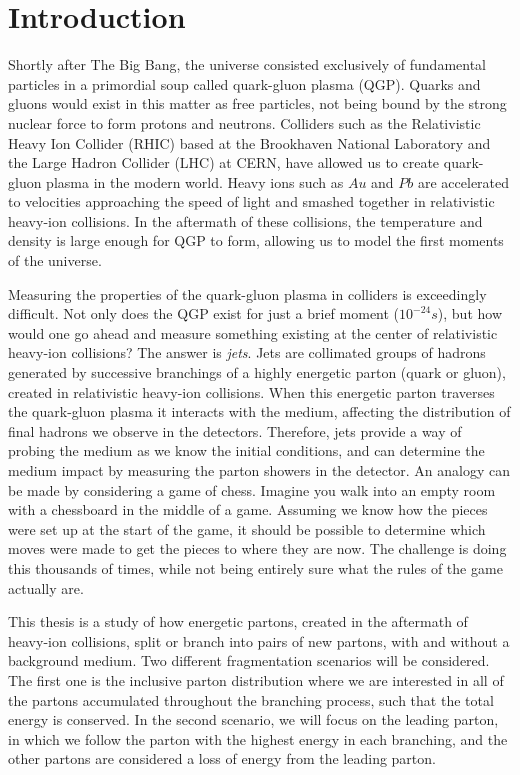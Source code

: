 \documentclass[main.tex]{subfiles}
\begin{document}
\chapter*{Introduction}\label{cpt:intro}
Shortly after The Big Bang, the universe consisted exclusively of fundamental particles in a primordial soup called quark-gluon plasma (QGP). Quarks and gluons would exist in this matter as free particles, not being bound by the strong nuclear force to form protons and neutrons.
Colliders such as the Relativistic Heavy Ion Collider (RHIC) based at the Brookhaven National Laboratory and the Large Hadron Collider (LHC) at CERN, have allowed us to create quark-gluon plasma in the modern world. Heavy ions such as \(Au\) and \(Pb\) are accelerated to velocities approaching the speed of light and smashed together in relativistic heavy-ion collisions. In the aftermath of these collisions, the temperature and density is large enough for QGP to form, allowing us to model the first moments of the universe.

Measuring the properties of the quark-gluon plasma in colliders is exceedingly difficult. Not only does the QGP exist for just a brief moment (\(10^{-24}s\)), but how would one go ahead and measure something existing at the center of relativistic heavy-ion collisions? The answer is \emph{jets}. Jets are collimated groups of hadrons generated by successive branchings of a highly energetic parton (quark or gluon), created in relativistic heavy-ion collisions. When this energetic parton traverses the quark-gluon plasma it interacts with the medium, affecting the distribution of final hadrons we observe in the detectors. Therefore, jets provide a way of probing the medium as we know the initial conditions, and can determine the medium impact by measuring the parton showers in the detector. An analogy can be made by considering a game of chess. Imagine you walk into an empty room with a chessboard in the middle of a game. Assuming we know how the pieces were set up at the start of the game, it should be possible to determine which moves were made to get the pieces to where they are now. The challenge is doing this thousands of times, while not being entirely sure what the rules of the game actually are.

This thesis is a study of how energetic partons, created in the aftermath of heavy-ion collisions, split or branch into pairs of new partons, with and without a background medium. Two different fragmentation scenarios will be considered. The first one is the inclusive parton distribution where we are interested in all of the partons accumulated throughout the branching process, such that the total energy is conserved. In the second scenario, we will focus on the leading parton, in which we follow the parton with the highest energy in each branching, and the other partons are considered a loss of energy from the leading parton.
\end{document}
